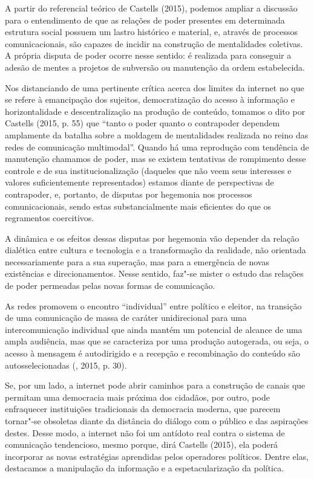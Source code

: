 A partir do referencial teórico de Castells (2015), podemos ampliar a
discussão para o entendimento de que as relações de poder presentes em
determinada estrutura social possuem um lastro histórico e material, e,
através de processos comunicacionais, são capazes de incidir na
construção de mentalidades coletivas. A própria disputa de poder ocorre
nesse sentido: é realizada para conseguir a adesão de mentes a projetos
de subversão ou manutenção da ordem estabelecida.

Nos distanciando de uma pertinente crítica acerca dos limites da
internet no que se refere à emancipação dos sujeitos, democratização do
acesso à informação e horizontalidade e descentralização na produção de
conteúdo, tomamos o dito por Castells (2015, p. 55) que ``tanto o poder
quanto o contrapoder dependem amplamente da batalha sobre a moldagem de
mentalidades realizada no reino das redes de comunicação multimodal''.
Quando há uma reprodução com tendência de manutenção chamamos de poder,
mas se existem tentativas de rompimento desse controle e de sua
institucionalização (daqueles que não veem seus interesses e valores
suficientemente representados) estamos diante de perspectivas de
contrapoder, e, portanto, de disputas por hegemonia nos processos
comunicacionais, sendo estas substancialmente mais eficientes do que os
regramentos coercitivos.

A dinâmica e os efeitos dessas disputas por hegemonia vão depender da
relação dialética entre cultura e tecnologia e a transformação da
realidade, não orientada necessariamente para a sua superação, mas para
a emergência de novas existências e direcionamentos. Nesse sentido,
faz"-se mister o estudo das relações de poder permeadas pelas novas
formas de comunicação.

As redes promovem o encontro ``individual'' entre político e eleitor, na
transição de uma comunicação de massa de caráter unidirecional para uma
intercomunicação individual que ainda mantém um potencial de alcance de
uma ampla audiência, mas que se caracteriza por uma produção autogerada,
ou seja, o acesso à mensagem é autodirigido e a recepção e recombinação
do conteúdo são autosselecionadas (, 2015, p. 30).

Se, por um lado, a internet pode abrir caminhos para a construção de
canais que permitam uma democracia mais próxima dos cidadãos, por outro,
pode enfraquecer instituições tradicionais da democracia moderna, que
parecem tornar"-se obsoletas diante da distância do diálogo com o público
e das aspirações destes. Desse modo, a internet não foi um antídoto real
contra o sistema de comunicação tendencioso, mesmo porque, dirá Castells
(2015), ela poderá incorporar as novas estratégias aprendidas pelos
operadores políticos. Dentre elas, destacamos a manipulação da
informação e a espetacularização da política.

